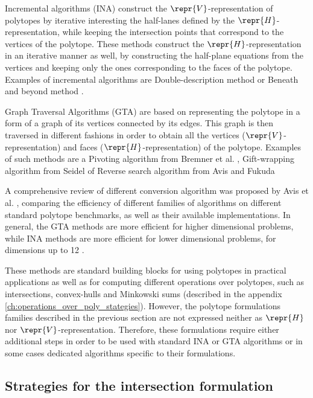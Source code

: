 Incremental algorithms (INA) construct the $\repr{V}$-representation of polytopes by iterative interesting the half-lanes defined by the $\repr{H}$-representation, while keeping the intersection points that correspond to the vertices of the polytope. These methods construct the $\repr{H}$-representation in an iterative manner as well, by constructing the half-plane equations from the vertices and keeping only the ones corresponding to the faces of the polytope. Examples of incremental algorithms are Double-description method \cite{MotzkinR1953dd,fukuda_dd} or Beneath and beyond method \cite{Seidel_1981}.

Graph Traversal Algorithms (GTA) are based on representing the polytope in a form of a graph of its vertices connected by its edges. This graph is then traversed in different fashions in order to obtain all the vertices ($\repr{V}$-representation) and faces ($\repr{H}$-representation) of the polytope. Examples of such methods are a Pivoting algorithm from Bremner et al. \cite{bremner_fukuda_marzetta_1998}, Gift-wrapping algorithm from Seidel \cite{Seidel1987outputsensitive} of Reverse search algorithm from Avis and Fukuda \cite{avis_pivoting_nodate}

A comprehensive review of different conversion algorithm was proposed by Avis et al. \cite{avis1997how}, comparing the efficiency of different families of algorithms on different standard polytope benchmarks, as well as their available implementations. In general, the GTA methods are more efficient for higher dimensional problems, while INA methods are more efficient for lower dimensional problems, for dimensions up to 12 \cite[Chapter 8.3]{fukuda2016lecture}.

These methods are standard building blocks for using polytopes in practical applications as well as for computing different operations over polytopes, such as intersections, convex-hulls and Minkowski sums (described in the appendix \ref{ch:operations_over_poly_stategies}). However, the polytope formulations families described in the previous section are not expressed neither as $\repr{H}$ nor $\repr{V}$-representation. Therefore, these formulations require either additional steps in order to be used with standard INA or GTA algorithms or in some cases dedicated algorithms specific to their formulations. 


\subsection{Strategies for the intersection formulation}
\label{ch:intersection_algos}


